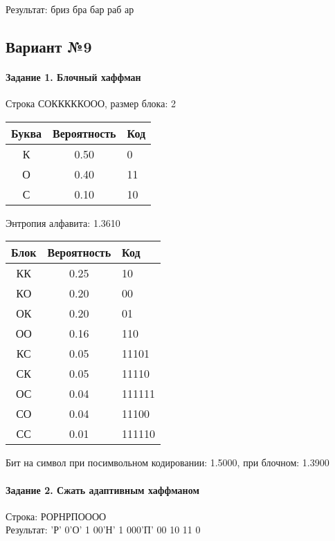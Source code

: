 \documentclass[a4paper, 12pt]{article}
\begin{document}
Результат: бриз бра бар раб ар
\pagebreak
\subsection{Вариант №9}
\paragraph{Задание 1. Блочный хаффман \\}

Строка СОКККККООО, размер блока: 2
\begin{center}
 \begin{tabular}{ |c|c|l| } 
  \hline
     Буква & Вероятность & Код\\ \hline
К & 0.50 & 0\\\hline
О & 0.40 & 11\\\hline
С & 0.10 & 10
\\ \hline \end{tabular}
\end{center}
Энтропия алфавита: 1.3610
\begin{center}
 \begin{tabular}{ |c|c|l| } 
  \hline
     Блок & Вероятность & Код\\ \hline
КК & 0.25 & 10\\\hline
КО & 0.20 & 00\\\hline
ОК & 0.20 & 01\\\hline
ОО & 0.16 & 110\\\hline
КС & 0.05 & 11101\\\hline
СК & 0.05 & 11110\\\hline
ОС & 0.04 & 111111\\\hline
СО & 0.04 & 11100\\\hline
СС & 0.01 & 111110
\\ \hline \end{tabular}
\end{center}
Бит на символ при посимвольном кодировании: 1.5000, при блочном: 1.3900


\pagebreak
\paragraph{Задание 2. Сжать адаптивным хаффманом\\}

Строка: 
РОРНРПОООО\\
Результат: 'Р' 0'О' 1 00'Н' 1 000'П' 00 10 11 0
\end{document}
